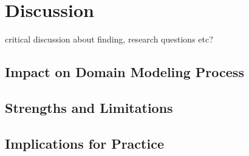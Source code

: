 \chapter{Discussion}
critical discussion about finding, research questions etc?
\section{Impact on Domain Modeling Process}
\section{Strengths and Limitations}
\section{Implications for Practice}